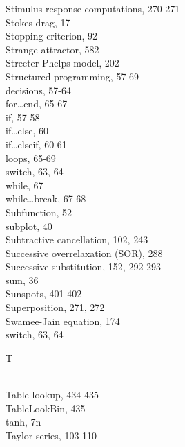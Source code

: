 \documentclass[../main.tex]{subfiles}
\begin{document}
\begin{multicols}{3}
    Stimulus-response computations, 270-271\\
    Stokes drag, 17\\
    Stopping criterion, 92\\
    Strange attractor, 582\\
    Streeter-Phelps model, 202\\
    Structured programming, 57-69\\
    \hspace*{3mm}decisions, 57-64\\
    \hspace*{3mm}for\ldots end, 65-67\\
    \hspace*{3mm}if, 57-58\\
    \hspace*{3mm}if\ldots else, 60\\
    \hspace*{3mm}if\ldots elseif, 60-61\\
    \hspace*{3mm}loops, 65-69\\
    \hspace*{3mm}switch, 63, 64\\
    \hspace*{3mm}while, 67\\
    \hspace*{3mm}while\ldots break, 67-68\\
    Subfunction, 52\\
    subplot, 40\\
    Subtractive cancellation, 102, 243\\
    Successive overrelaxation (SOR), 288\\
    Successive substitution, 152, 292-293\\
    sum, 36\\
    Sunspots, 401-402\\
    Superposition, 271, 272\\
    Swamee-Jain equation, 174\\
    switch, 63, 64\vspace*{2mm}\\
    \begin{huge} T \end{huge}\\
    Table lookup, 434-435\\
    TableLookBin, 435\\
    tanh, 7n\\
    Taylor series, 103-110\\

\end{multicols}
\end{document}
